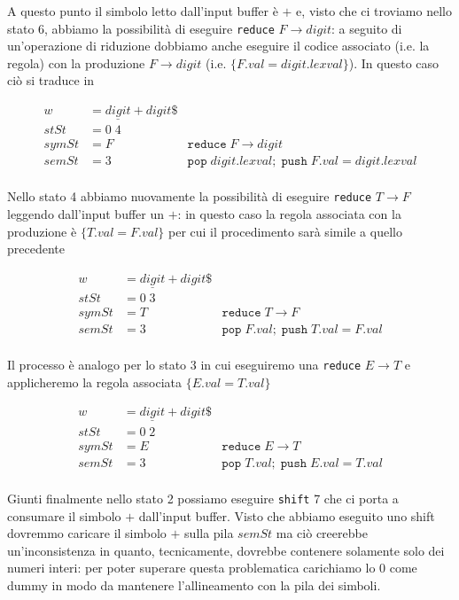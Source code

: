 \documentclass[class=book, crop=false, oneside, 12pt]{standalone}
\begin{document}
A questo punto il simbolo letto dall'input buffer è \(+\) e, visto che ci troviamo nello stato 6, abbiamo la possibilità di eseguire \texttt{reduce} \(F \to digit\): a seguito di un'operazione di riduzione dobbiamo anche eseguire il codice associato (i.e. la regola) con la produzione \(F \to digit\) (i.e. \(\{F.val = digit.lexval\}\)). In questo caso ciò si traduce in 

\begin{align*}
    w &= \underline{digit} + digit\$ \\
    stSt &= 0\; 4 \\
    symSt &= F &\texttt{reduce}\; F \to digit \\     
    semSt &= 3 &\texttt{pop}\;digit.lexval;\; \texttt{push}\;F.val = digit.lexval\\
\end{align*}

Nello stato 4 abbiamo nuovamente la possibilità di eseguire \texttt{reduce} \(T \to F\) leggendo dall'input buffer un \(+\): in questo caso la regola associata con la produzione è \(\{T.val = F.val\}\) per cui il procedimento sarà simile a quello precedente

\begin{align*}
    w &= \underline{digit} + digit\$ \\
    stSt &= 0\; 3 \\
    symSt &= T &\texttt{reduce}\; T \to F \\     
    semSt &= 3 &\texttt{pop}\;F.val;\; \texttt{push}\;T.val = F.val\\
\end{align*}

Il processo è analogo per lo stato 3 in cui eseguiremo una \texttt{reduce} \(E \to T\) e applicheremo la regola associata \(\{E.val = T.val\}\)

\begin{align*}
    w &= \underline{digit} + digit\$ \\
    stSt &= 0\; 2 \\
    symSt &= E &\texttt{reduce}\; E \to T \\     
    semSt &= 3 &\texttt{pop}\;T.val;\; \texttt{push}\;E.val = T.val \\
\end{align*}

Giunti finalmente nello stato 2 possiamo eseguire \texttt{shift} 7 che ci porta a consumare il simbolo \(+\) dall'input buffer. Visto che abbiamo eseguito uno shift dovremmo caricare il simbolo \(+\) sulla pila \(semSt\) ma ciò creerebbe un'inconsistenza in quanto, tecnicamente, dovrebbe contenere solamente solo dei numeri interi: per poter superare questa problematica carichiamo lo 0 come dummy in modo da mantenere l'allineamento con la pila dei simboli. 
\end{document}
